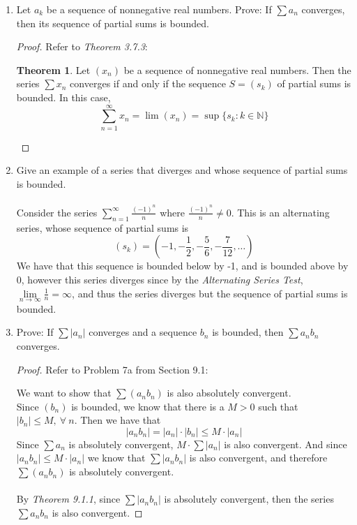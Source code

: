 \documentclass[12pt,letterpaper]{article}
\newcommand{\limx}[2]{\displaystyle\lim\limits_{#1 \to #2}}
\newcommand{\N}{\mathbb{N}}
\theoremstyle{case}
\theoremstyle{definition}
\newtheorem*{theorem*}{Theorem}
\begin{document}
\begin{enumerate}
\begin{enumerate}
			\item Let $a_k$ be a sequence of nonnegative real numbers. Prove: If $\sum a_n$ converges, then its sequence of partial sums is bounded.
			\begin{proof}
				Refer to \textit{Theorem 3.7.3}:
				\begin{theorem*}
					Let $(x_n)$ be a sequence of nonnegative real numbers. Then the series $\sum x_n$ converges if and only if the sequence $S=(s_k)$ of partial sums is bounded. In this case,
					\[\sum_{n=1}^{\infty} x_n = \lim (x_n) = \sup \{s_k:k \in \N\}\]
				\end{theorem*}
			\end{proof}
			\item Give an example of a series that diverges and whose sequence of partial sums is bounded.
			\\\\Consider the series $\displaystyle\sum_{n=1}^{\infty} \frac{(-1)^n}{n}$ where $\frac{(-1)^n}{n}\neq 0$. This is an alternating series, whose sequence of partial sums is
			\[(s_k)=\left(-1,-\frac{1}{2},-\frac{5}{6}, -\frac{7}{12}, \dots\right)\]
			We have that this sequence is bounded below by -1, and is bounded above by 0, however this series diverges since by the \textit{Alternating Series Test}, $\limx{n}{\infty} \frac{1}{n} = \infty$, and thus the series diverges but the sequence of partial sums is bounded.\\
			
			\item Prove: If $\sum |a_n|$ converges and a sequence $b_n$ is bounded, then $\sum a_nb_n$ converges.
			\begin{proof}
				Refer to Problem 7a from Section 9.1:
				
				We want to show that $\sum (a_nb_n)$ is also absolutely convergent.\\
				Since $(b_n)$ is bounded, we know that there is a $M > 0$ such that $|b_n| \leq M,\ \forall\ n$. Then we have that
				\[|a_nb_n|=|a_n|\cdot|b_n|\leq M \cdot |a_n|\]
				Since $\sum a_n$ is absolutely convergent, $M \cdot \sum |a_n|$ is also convergent. And since $|a_nb_n| \leq M \cdot |a_n|$ we know that $\sum |a_nb_n|$ is also convergent, and therefore $\sum (a_nb_n)$ is absolutely convergent.
				\\\\By \textit{Theorem 9.1.1}, since $\sum |a_nb_n|$ is absolutely convergent, then the series $\sum a_nb_n$ is also convergent.
			\end{proof}
		\end{enumerate}
	

\end{enumerate}
\end{document}
